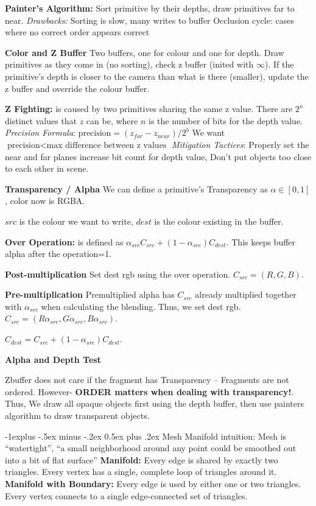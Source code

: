 \documentclass[letterpaper, 8pt]{extarticle}
\makeatletter
\renewcommand{\section}{\@startsection{section}{1}{0mm}%
                                {-1explus -.5ex minus -.2ex}%
                                {0.5ex plus .2ex}%
                                {\normalfont\small\bfseries}}
\makeatother
\begin{document}
\begin{multicols*}{4}
\textbf{Painter's Algorithm:} Sort primitive by their depths, draw primitives far to near. \textit{Drawbacks:} Sorting is slow, many writes to buffer
Occlusion cycle: cases where no correct order appears correct


\textbf{Color and Z Buffer} Two buffers, one for colour and one for depth. 
Draw primitives as they come in (no sorting), 
check z buffer (inited with $\infty$). 
If the primitive's depth is closer to the camera than what is there (smaller), update the z buffer and override the colour buffer.

\textbf{Z Fighting:} is caused by two primitives sharing the same z value. There are $2^n$ distinct values that $z$ can be, where $n$ is the number of bits for the depth value.
\textit{Precision Formula}:
\(
\text{precision} = (z_{far} - z_{near}) / 2^b
\)
We want \(\text{precision} < \text{max difference between z values}\)
\textit{Mitigation Tactices}: Properly set the near and far planes increase bit count for depth value, Don't put objects too close to each other in scene.


\textbf{Transparency / Alpha}
We can define a primitive's Transparency as $\alpha \in [0, 1]$, color now is RGBA.

$src$ is the colour we want to write, $dest$ is the colour existing in the buffer.

\textbf{Over Operation:} is defined as $\alpha_{src}C_{src} + (1-\alpha_{src})C_{dest}$.
This keeps buffer alpha after the operation=1.

\textbf{Post-multiplication}
Set dest rgb using the over operation. $C_{src} = (R,G,B)$.

\textbf{Pre-multiplication}
Premultiplied alpha has $C_{src}$ already multiplied together with $\alpha_{src}$ when calculating the blending.
Thus, we set dest rgb. $C_{src} = (R\alpha_{src},G\alpha_{src},B\alpha_{src})$.

$C_{dest} = C_{src} + (1-\alpha_{src})C_{dest}$.

\textbf{Alpha and Depth Test}

Zbuffer does not care if the fragment has Transparency -- Fragments are not ordered. However- \textbf{ORDER matters when dealing with transparency!}. 
Thus, We draw all opaque objects first using the depth buffer, then use painters algorithm to draw transparent objects.

\section{Mesh}
Manifold intuition:
Mesh is ``watertight'',
``a small neighborhood around any point could be smoothed out into a bit of flat surface''
\textbf{Manifold:} Every edge is shared by exactly two triangles. Every vertex has a single, complete loop of triangles around it.
\textbf{Manifold with Boundary:} Every edge is used by either one or two triangles. Every vertex connects to a single edge-connected set of triangles.


\end{multicols*}
\end{document}

